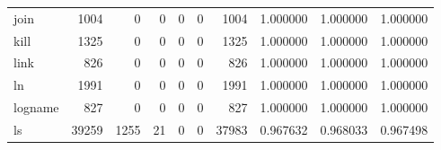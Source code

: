 \begin{longtable}{lrrrrrrrrr}
join      &                                1004 &                                               0 &                                              0 &                                             0 &                                              0 &                                         1004 &                                           1.000000 &                               1.000000 &                             1.000000 \\
kill      &                                1325 &                                               0 &                                              0 &                                             0 &                                              0 &                                         1325 &                                           1.000000 &                               1.000000 &                             1.000000 \\
link      &                                 826 &                                               0 &                                              0 &                                             0 &                                              0 &                                          826 &                                           1.000000 &                               1.000000 &                             1.000000 \\
ln        &                                1991 &                                               0 &                                              0 &                                             0 &                                              0 &                                         1991 &                                           1.000000 &                               1.000000 &                             1.000000 \\
logname   &                                 827 &                                               0 &                                              0 &                                             0 &                                              0 &                                          827 &                                           1.000000 &                               1.000000 &                             1.000000 \\
ls        &                               39259 &                                            1255 &                                             21 &                                             0 &                                              0 &                                        37983 &                                           0.967632 &                               0.968033 &                             0.967498 \\

\end{longtable}
